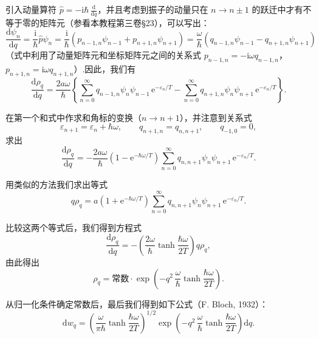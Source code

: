 引入动量算符 $\hat{p}=-\mathrm{i}\hbar\,\frac{\mathrm{d}}{\mathrm{d}q}$，并且考虑到振子的动量只在 $n\to n\pm1$ 的跃迁中才有不等于零的矩阵元（参看本教程第三卷§23），可以写出：
\begin{equation*}
  \frac{\mathrm{d}\psi_n}{\mathrm{d}q}=\frac{\mathrm{i}}{\hbar}\hat{p}\psi_n
  =\frac{\mathrm{i}}{\hbar}\left(p_{n-1,n}\psi_{n-1}+p_{n+1,n}\psi_{n+1}\right)
  =\frac{\omega}{\hbar}\left(q_{n-1,n}\psi_{n-1}-q_{n+1,n}\psi_{n+1}\right)
\end{equation*}
（式中利用了动量矩阵元和坐标矩阵元之间的关系式 $p_{n-1,n}=-\mathrm{i}\omega q_{n-1,n}$，$p_{n+1,n}=\mathrm{i}\omega q_{n+1,n}$）.因此，我们有
\begin{equation*}
  \frac{\mathrm{d}\rho_q}{\mathrm{d}q}=\frac{2a\omega}{\hbar}
  \left\{\sum_{n=0}^{\infty}q_{n-1,n}\psi_n\psi_{n-1}\,\mathrm{e}^{-\varepsilon_n/T}
  -\sum_{n=0}^{\infty}q_{n+1,n}\psi_n\psi_{n+1}\,\mathrm{e}^{-\varepsilon_n/T}\right\}.
\end{equation*}

在第一个和式中作求和角标的变换（$n\to n+1$），并注意到关系式
\begin{equation*}
  \varepsilon_{n+1}=\varepsilon_n+\hbar\omega,\qquad
  q_{n+1,n}=q_{n,n+1},\qquad
  q_{-1,0}=0,
\end{equation*}
求出
\begin{equation*}
  \frac{\mathrm{d}\rho_q}{\mathrm{d}q}
  =-\frac{2a\omega}{\hbar}\left(1-\mathrm{e}^{-\hbar\omega/T}\right)
  \sum_{n=0}^{\infty}q_{n,n+1}\psi_n\psi_{n+1}\,\mathrm{e}^{-\varepsilon_n/T}.
\end{equation*}

用类似的方法我们求出等式
\begin{equation*}
  q\rho_q=a\left(1+\mathrm{e}^{-\hbar\omega/T}\right)
  \sum_{n=0}^{\infty}q_{n,n+1}\psi_n\psi_{n+1}\,\mathrm{e}^{-\varepsilon_n/T}.
\end{equation*}

比较这两个等式后，我们得到方程式
\begin{equation*}
  \frac{\mathrm{d}\rho_q}{\mathrm{d}q}
  =-\left(\frac{2\omega}{\hbar}\tanh\frac{\hbar\omega}{2T}\right)q\rho_q,
\end{equation*}
由此得出
\begin{equation*}
  \rho_q=\text{常数}\cdot\exp\left(-q^2\,\frac{\omega}{\hbar}\tanh\frac{\hbar\omega}{2T}\right).
\end{equation*}

从归一化条件确定常数后，最后我们得到如下公式（F. Bloch, 1932）：
\begin{equation}
  \mathrm{d}w_q=\left(\frac{\omega}{\pi\hbar}\tanh\frac{\hbar\omega}{2T}\right)^{1/2}
  \exp\left(-q^2\,\frac{\omega}{\hbar}\tanh\frac{\hbar\omega}{2T}\right)\mathrm{d}q.
\end{equation}

